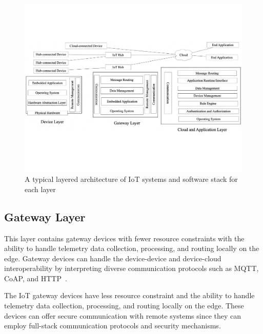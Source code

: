  \begin{figure}[t]
  \centering 
   \includegraphics[width=\linewidth]{./imgs/arch1.pdf}
  \caption{A typical layered architecture of IoT systems and software stack for each layer}
  \label{fig:arch}
\end{figure}


\subsection{Gateway Layer}
This layer contains gateway devices with fewer resource constraints with the ability to handle telemetry data collection, processing, and routing locally on the edge. Gateway devices can handle the device-device and device-cloud interoperability by interpreting diverse communication protocols such as MQTT, CoAP, and HTTP~\cite{tschofenig2014architectural}. 

The IoT gateway devices have less resource constraint and the ability to handle telemetry data collection, processing, and routing locally on the edge. These devices can offer secure communication with remote systems since they can employ full-stack communication protocols and security mechanisms\cite{bormann2014terminology}.

